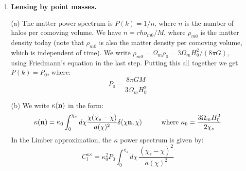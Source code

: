 \documentclass[aps,prd,superscriptaddress,groupedaddress,nofootinbib,nobibnotes]{revtex4}
\newcommand{\be}{\begin{equation}}
\newcommand{\ee}{\end{equation}}
\def\n{{\bf n}}
\begin{document}
\begin{enumerate}

\item
{\bf Lensing by point masses.}

(a)
The matter power spectrum is $P(k)=1/n$, where $n$ is the number of halos per comoving volume.
We have $n = rho_{m0}/M$, where $\rho_{m0}$ is the matter density today (note that $\rho_{m0}$
is also the matter density per comoving volume, which is independent of time).  We write
$\rho_{m0} = \Omega_m \rho_0 = 3 \Omega_m H_0^2 / (8\pi G)$, using Friedmann's equation in
the last step.  Putting this all together we get $P(k) = P_0$, where:
\be
P_0 = \frac{8 \pi G M}{3 \Omega_m H_0^2}
\ee

(b)
We write $\kappa(\n)$ in the form:
\be
\kappa(\n) = \kappa_0 \int_0^{\chi_s} d\chi \frac{\chi(\chi_s-\chi)}{a(\chi)^2} \delta(\chi\n,\chi) 
  \hspace{1cm} \mbox{where }
  \kappa_0 = \frac{3\Omega_m H_0^2}{2\chi_s}
\ee
In the Limber approximation, the $\kappa$ power spectrum is given by:
\be
C_l^{\kappa\kappa} = \kappa_0^2 P_0 \int_0^{\chi_s} d\chi \, \frac{(\chi_s - \chi)^2}{a(\chi)^2}
\ee


\end{enumerate}
\end{document}
